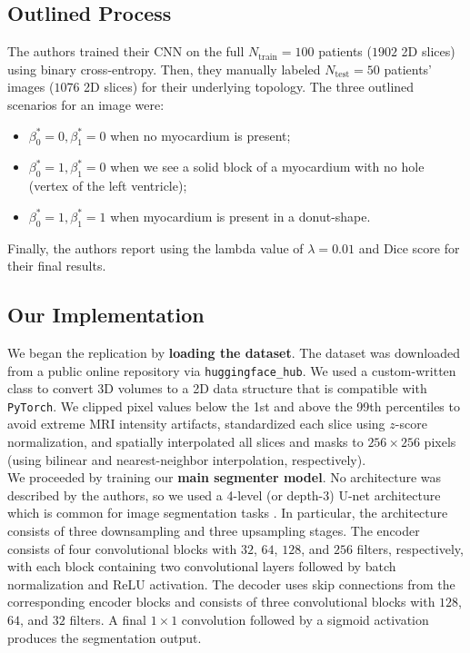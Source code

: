 \subsection{Outlined Process}

The authors trained their CNN on the full $N_\text{train}=100$ patients ($1902$ 2D slices) using binary cross-entropy. Then, they manually labeled $N_\text{test}=50$ patients' images ($1076$ 2D slices) for their underlying topology. The three outlined scenarios for an image were:
\begin{itemize}
    \item $\beta^*_0 = 0, \beta^*_1 = 0$ when no myocardium is present;
    \item $\beta^*_0 = 1, \beta^*_1 = 0$ when we see a solid block of a myocardium with no hole (vertex of the left ventricle);
    \item $\beta^*_0 = 1, \beta^*_1 = 1$ when myocardium is present in a donut-shape.
\end{itemize}
Finally, the authors report using the lambda value of $\lambda=0.01$ and Dice score for their final results.


\subsection{Our Implementation}

We began the replication by \textbf{loading the dataset}. The dataset was downloaded from a public online repository via \texttt{huggingface\_hub}. We used a custom-written class to convert 3D volumes to a 2D data structure that is compatible with \texttt{PyTorch}. We clipped pixel values below the 1st and above the 99th percentiles to avoid extreme MRI intensity artifacts, standardized each slice using $z$-score normalization, and spatially interpolated all slices and masks to $256 \times 256$ pixels (using bilinear and nearest-neighbor interpolation, respectively). \\

We proceeded by training our \textbf{main segmenter model}. No architecture was described by the authors, so we used a 4-level (or depth-3) U-net architecture which is common for image segmentation tasks \supercite{Ronneberger:2015} \supercite{Bernard:2018}. In particular, the architecture consists of three downsampling and three upsampling stages. The encoder consists of four convolutional blocks with $32$, $64$, $128$, and $256$ filters, respectively, with each block containing two convolutional layers followed by batch normalization and ReLU activation. The decoder uses skip connections from the corresponding encoder blocks and consists of three convolutional blocks with $128$, $64$, and $32$ filters. A final $1\times1$ convolution followed by a sigmoid activation produces the segmentation output. \\

